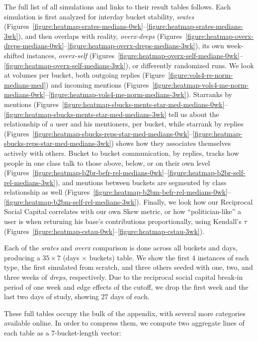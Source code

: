 \documentclass[10pt,oneside]{memoir}
\begin{document}
\begin{Spacing}{2}
The full list of all simulations and links to their result tables follows.  Each simulation is first analyzed for interday bucket stability, {\itshape srates} (Figures~\ref{figure:heatmap-srates-medians-0wk}--\ref{figure:heatmap-srates-medians-3wk}), and then overlaps with reality, {\itshape overx-dreps} (Figures~\ref{figure:heatmap-overx-dreps-medians-0wk}--\ref{figure:heatmap-overx-dreps-medians-3wk}), its own week-shifted instances, {\itshape overx-self} (Figures~\ref{figure:heatmap-overx-self-medians-0wk}--\ref{figure:heatmap-overx-self-medians-3wk}), or differently randomized runs.  We look at volumes per bucket, both outgoing replies (Figure~\ref{figure:vols4-re-norm-medians-med}) and incoming mentions (Figures~\ref{figure:heatmap-vols4-me-norm-medians-0wk}--\ref{figure:heatmap-vols4-me-norm-medians-3wk}).  Starranks by mentions (Figures~\ref{figure:heatmap-sbucks-ments-star-med-medians-0wk}--\ref{figure:heatmap-sbucks-ments-star-med-medians-3wk} tell us about the relationship of a user and his mentioners, per bucket, while starrank by replies (Figures~\ref{figure:heatmap-sbucks-reps-star-med-medians-0wk}--\ref{figure:heatmap-sbucks-reps-star-med-medians-3wk}) shows how they associates themselves actively with others.  Bucket to bucket communication, by replies, tracks how people in one class talk to those above, below, or on their own level (Figures~\ref{figure:heatmap-b2br-befr-rel-medians-0wk}--\ref{figure:heatmap-b2br-self-rel-medians-3wk}), and mentions between buckets are segmented by class relationship as well (Figures~\ref{figure:heatmap-b2bm-befr-rel-medians-0wk}--\ref{figure:heatmap-b2bm-self-rel-medians-3wk}).  Finally, we look how our Reciprocal Social Capital correlates with our own Skew metric, or how ``politician-like'' a user is when returning his base's contributions proportionally, using Kendall's $\tau$ (Figures~\ref{figure:heatmap-cstau-0wk}--\ref{figure:heatmap-cstau-3wk}). 


Each of the {\itshape srates} and {\itshape overx} comparison is done across all buckets and days, producing a $35 \times 7$ (days $\times$ buckets) table.  We show the first 4 instances of each type, the first simulated from scratch, and three others seeded with one, two, and three weeks of {\itshape dreps}, respectively.  Due to the reciprocal social capital break-in period of one week and edge effects of the cutoff, we drop the first week and the last two days of study, showing 27 days of each.


These full tables occupy the bulk of the appendix, with several more categories available online.  In order to compress them, we compute two aggregate lines of each table as a 7-bucket-length vector:



\end{Spacing}
\end{document}
